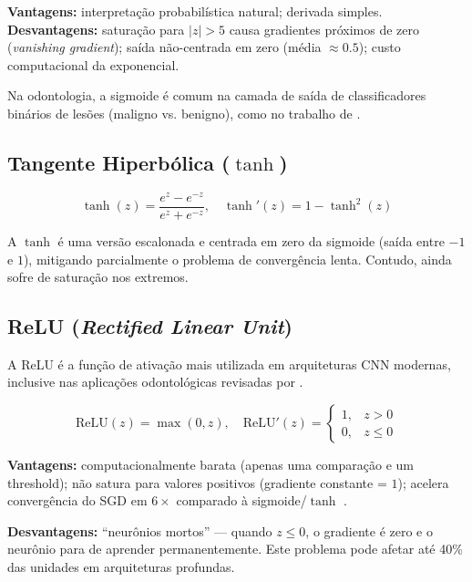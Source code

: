 \textbf{Vantagens:} interpretação probabilística natural; derivada simples.
\textbf{Desvantagens:} saturação para $|z| > 5$ causa gradientes próximos de zero
(\textit{vanishing gradient}); saída não-centrada em zero (média $\approx 0.5$);
custo computacional da exponencial.

Na odontologia, a sigmoide é comum na camada de saída de classificadores binários
de lesões (maligno vs. benigno), como no trabalho de .

\subsection{Tangente Hiperbólica ($\tanh$)}

\begin{equation}
  \tanh(z) = \frac{e^z - e^{-z}}{e^z + e^{-z}}, \quad \tanh'(z) = 1 - \tanh^2(z)
  \label{eq:tanh}
\end{equation}

A $\tanh$ é uma versão escalonada e centrada em zero da sigmoide (saída entre $-1$
e $1$), mitigando parcialmente o problema de convergência lenta. Contudo, ainda sofre
de saturação nos extremos.

\subsection{ReLU (\textit{Rectified Linear Unit})}

A ReLU é a função de ativação mais utilizada em arquiteturas CNN modernas, inclusive
nas aplicações odontológicas revisadas por .

\begin{equation}
  \text{ReLU}(z) = \max(0, z), \quad \text{ReLU}'(z) = \begin{cases}
    1, & z > 0 \\
    0, & z \leq 0
  \end{cases}
  \label{eq:relu}
\end{equation}

\textbf{Vantagens:} computacionalmente barata (apenas uma comparação e um threshold);
não satura para valores positivos (gradiente constante = $1$); acelera convergência
do SGD em $6\times$ comparado à sigmoide/$\tanh$ \cite{lecun2015deep}.

\textbf{Desvantagens:} ``neurônios mortos'' --- quando $z \leq 0$, o gradiente é zero
e o neurônio para de aprender permanentemente. Este problema pode afetar até 40\%
das unidades em arquiteturas profundas.

